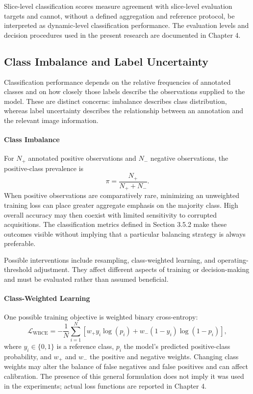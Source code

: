 Slice-level classification scores measure agreement with slice-level evaluation targets and cannot, without a defined aggregation and reference protocol, be interpreted as dynamic-level classification performance. The evaluation levels and decision procedures used in the present research are documented in Chapter 4.

\subsection{Class Imbalance and Label Uncertainty}

Classification performance depends on the relative frequencies of annotated classes and on how closely those labels describe the observations supplied to the model. These are distinct concerns: imbalance describes class distribution, whereas label uncertainty describes the relationship between an annotation and the relevant image information.

\paragraph{Class Imbalance}
For $N_+$ annotated positive observations and $N_-$ negative observations, the positive-class prevalence is
\begin{equation}
\pi=\frac{N_+}{N_++N_-}.
\end{equation}
When positive observations are comparatively rare, minimizing an unweighted training loss can place greater aggregate emphasis on the majority class. High overall accuracy may then coexist with limited sensitivity to corrupted acquisitions. The classification metrics defined in Section 3.5.2 make these outcomes visible without implying that a particular balancing strategy is always preferable.

Possible interventions include resampling, class-weighted learning, and operating-threshold adjustment. They affect different aspects of training or decision-making and must be evaluated rather than assumed beneficial.

\paragraph{Class-Weighted Learning}
One possible training objective is weighted binary cross-entropy:
\begin{equation}
\mathcal{L}_{\mathrm{WBCE}}=
-\frac{1}{N}\sum_{i=1}^{N}
\left[w_+y_i\log(p_i)+w_-(1-y_i)\log(1-p_i)\right],
\end{equation}
where $y_i\in\{0,1\}$ is a reference class, $p_i$ the model's predicted positive-class probability, and $w_+$ and $w_-$ the positive and negative weights. Changing class weights may alter the balance of false negatives and false positives and can affect calibration. The presence of this general formulation does not imply it was used in the experiments; actual loss functions are reported in Chapter 4.

